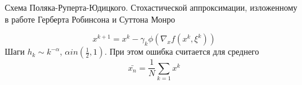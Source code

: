  Схема Поляка-Руперта-Юдицкого. Стохастической аппроксимации,
изложенному в работе Герберта Робинсона и Суттона Монро \cite{robbins1951stochastic}




\begin{equation}
    x^{k+1} = x^{k} - \gamma_k \phi(\nabla_x f(x^k,\xi^k))
\end{equation}
Шаги $h_k \sim k^{-\alpha}$, $\alpha in (\frac{1}{2},1)$.
При этом ошибка считается для среднего
\begin{equation}
    \bar{x_n} = \frac{1}{N} \sum_{k=1} x^k
\end{equation}

